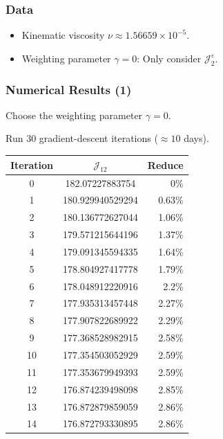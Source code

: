 \documentclass[10pt,xcolor=table,english]{beamer}   %
\begin{document}
\begin{frame}
    \frametitle{Data}
    \begin{itemize}
        \item Kinematic viscosity $\nu\approx 1.56659\times10^{-5}$.
        \vspace{1cm}
        \vspace{1cm}
        \item Weighting parameter $\gamma = 0$: Only consider $\mathcal{J}_2^\varepsilon$.
    \end{itemize}    
\end{frame}


\begin{frame}
    \frametitle{Numerical Results (1)}
    Choose the weighting parameter $\gamma = 0$.
    
    Run 30 gradient-descent iterations ($\approx 10$ days). 
    \begin{table}
        \centering
        \begin{tabular}{|c|c|r|}
            \hline
            \textbf{Iteration} & $\mathcal{J}_{12}$ & Reduce \\
            \hline
            0 & 182.07227883754 & 0\% \\
            \hline
            1 & 180.929940529294 & 0.63\% \\
            \hline
            2 & 180.136772627044 & 1.06\% \\
            \hline
            3 & 179.571215644196 & 1.37\% \\
            \hline
            4 & 179.091345594335 & 1.64\% \\
            \hline
            5 & 178.804927417778 & 1.79\% \\
            \hline
            6 & 178.048912220916 & 2.2\% \\
            \hline
            7 & 177.935313457448 & 2.27\% \\
            \hline
            8 & 177.907822689922 & 2.29\% \\
            \hline
            9 & 177.368528982915 & 2.58\% \\
            \hline
            10 & 177.354503052929 & 2.59\% \\
            \hline
            11 & 177.353679949393 & 2.59\% \\
            \hline
            12 & 176.874239498098 & 2.85\% \\
            \hline
            13 & 176.872879859059 & 2.86\% \\
            \hline
            14 & 176.872793330895 & 2.86\% \\
            \hline
        \end{tabular}
    \end{table}
\end{frame}
\end{document}
